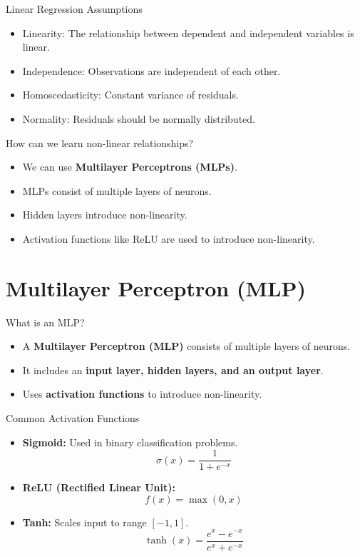 \documentclass{beamer}
\begin{document}
\begin{frame}{Linear Regression Assumptions}
    \begin{itemize}
        \item Linearity: The relationship between dependent and independent variables is linear.
        \item Independence: Observations are independent of each other.
        \item Homoscedasticity: Constant variance of residuals.
        \item Normality: Residuals should be normally distributed.
    \end{itemize}
\end{frame}

\begin{frame}{How can we learn non-linear relationships?}
    \begin{itemize}
        \item We can use \textbf{Multilayer Perceptrons (MLPs)}.
        \item MLPs consist of multiple layers of neurons.
        \item Hidden layers introduce non-linearity.
        \item Activation functions like ReLU are used to introduce non-linearity.
    \end{itemize}
\end{frame}


\section{Multilayer Perceptron (MLP)}
\begin{frame}{What is an MLP?}
    \begin{itemize}
        \item A \textbf{Multilayer Perceptron (MLP)} consists of multiple layers of neurons.
        \item It includes an \textbf{input layer, hidden layers, and an output layer}.
        \item Uses \textbf{activation functions} to introduce non-linearity.
    \end{itemize}
\end{frame}

\begin{frame}{Common Activation Functions}
    \begin{itemize}
        \item \textbf{Sigmoid:} Used in binary classification problems.
        \[
        \sigma(x) = \frac{1}{1 + e^{-x}}
        \]
        \item \textbf{ReLU (Rectified Linear Unit):}
        \[
        f(x) = \max(0, x)
        \]
        \item \textbf{Tanh:} Scales input to range \([-1, 1]\).
        \[
        \tanh(x) = \frac{e^x - e^{-x}}{e^x + e^{-x}}
        \]
    \end{itemize}
\end{frame}
\end{document}

